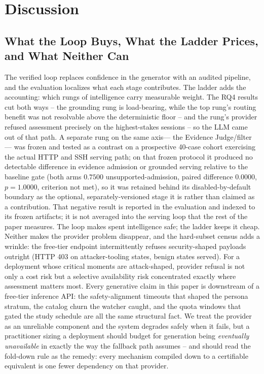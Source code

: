 \section{Discussion}
\label{sec:discussion}

\subsection{What the Loop Buys, What the Ladder Prices, and What Neither Can}
The verified loop replaces confidence in the generator with an audited
pipeline, and the evaluation localizes what each stage
contributes. The ladder adds the accounting: which rungs of intelligence
carry measurable weight. The RQ4 results cut both ways -- the
grounding rung is load-bearing, while the top rung's routing benefit
was not resolvable above the deterministic floor -- and the rung's
provider refused assessment precisely on the highest-stakes sessions --
so the LLM came out of that path. A separate rung on the same axis---
the Evidence Judge/filter --- was frozen and tested as a contrast on a
prospective 40-case cohort exercising the actual HTTP and SSH serving
path; on that frozen protocol it produced no detectable difference in
evidence admission or grounded serving relative to the baseline gate
(both arms $0.7500$ unsupported-admission, paired difference $0.0000$,
$p=1.0000$, criterion not met), so it was retained behind its
disabled-by-default boundary as the optional, separately-versioned stage
it is rather than claimed as a contribution. That negative result is
reported in the evaluation and indexed to its frozen artifacts; it is
not averaged into the serving loop that the rest of the paper measures. The loop makes spent intelligence
safe; the ladder keeps it cheap. Neither makes the provider problem
disappear, and the hard-subset census adds a wrinkle: the free-tier
endpoint intermittently refuses security-shaped payloads outright
(HTTP 403 on attacker-tooling states, benign states served). For a
deployment whose critical moments are attack-shaped, provider refusal
is not only a cost risk but a selective availability risk concentrated
exactly where assessment matters most. Every
generative claim in this paper is downstream of a free-tier inference
API: the safety-alignment timeouts that shaped the persona stratum, the
catalog churn the watcher caught, and the quota windows that gated the
study schedule are all the same structural fact. We treat the provider as
an unreliable component and the system degrades safely when it fails, but
a practitioner sizing a deployment should budget for generation being
\emph{eventually unavailable} in exactly the way the fallback path
assumes -- and should read the fold-down rule as the remedy: every
mechanism compiled down to a certifiable equivalent is one fewer
dependency on that provider.

